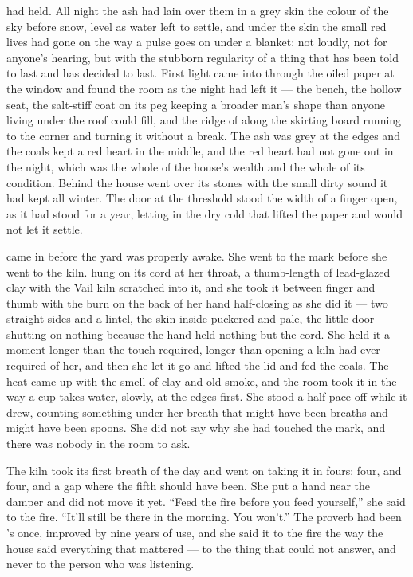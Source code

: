 
 had held. All night the ash had lain over them in a grey skin the colour of the sky before snow, level as water left to settle, and under the skin the small red lives had gone on the way a pulse goes on under a blanket: not loudly, not for anyone's hearing, but with the stubborn regularity of a thing that has been told to last and has decided to last. First light came into  through the oiled paper at the window and found the room as the night had left it --- the bench, the hollow seat, the salt-stiff coat on its peg keeping a broader man's shape than anyone living under the roof could fill, and the ridge of  along the skirting board running to the corner and turning it without a break. The ash was grey at the edges and the coals kept a red heart in the middle, and the red heart had not gone out in the night, which was the whole of the house's wealth and the whole of its condition. Behind the house  went over its stones with the small dirty sound it had kept all winter. The door at the threshold stood the width of a finger open, as it had stood for a year, letting in the dry cold that lifted the paper and would not let it settle.

 came in before the yard was properly awake. She went to the mark before she went to the kiln.  hung on its cord at her throat, a thumb-length of lead-glazed clay with the Vail kiln scratched into it, and she took it between finger and thumb with the burn on the back of her hand half-closing as she did it --- two straight sides and a lintel, the skin inside puckered and pale, the little door shutting on nothing because the hand held nothing but the cord. She held it a moment longer than the touch required, longer than opening a kiln had ever required of her, and then she let it go and lifted the lid and fed the coals. The heat came up with the smell of clay and old smoke, and the room took it in the way a cup takes water, slowly, at the edges first. She stood a half-pace off while it drew, counting something under her breath that might have been breaths and might have been spoons. She did not say why she had touched the mark, and there was nobody in the room to ask.

The kiln took its first breath of the day and went on taking it in fours: four, and four, and a gap where the fifth should have been. She put a hand near the damper and did not move it yet. “Feed the fire before you feed yourself,” she said to the fire. “It'll still be there in the morning. You won't.” The proverb had been 's once, improved by nine years of use, and she said it to the fire the way the house said everything that mattered --- to the thing that could not answer, and never to the person who was listening.

